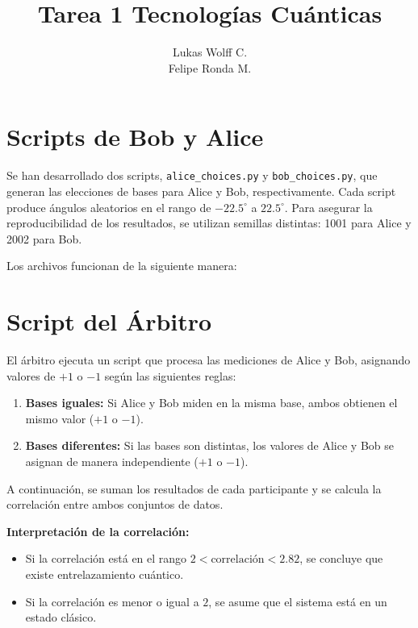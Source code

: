 \documentclass[11pt]{article}
\title{Tarea 1 Tecnologías Cuánticas}
\author{Lukas Wolff C.\\
        Felipe Ronda M.}
\date{}
\begin{document}
\maketitle

\section{Scripts de Bob y Alice}

Se han desarrollado dos scripts, \texttt{alice\_choices.py} y \texttt{bob\_choices.py}, que generan las elecciones de bases para Alice y Bob, respectivamente. Cada script produce ángulos aleatorios en el rango de $-22.5^\circ$ a $22.5^\circ$. Para asegurar la reproducibilidad de los resultados, se utilizan semillas distintas: 1001 para Alice y 2002 para Bob.

Los archivos funcionan de la siguiente manera:

\section{Script del Árbitro}

El árbitro ejecuta un script que procesa las mediciones de Alice y Bob, asignando valores de $+1$ o $-1$ según las siguientes reglas:

\begin{enumerate}
    \item \textbf{Bases iguales:} Si Alice y Bob miden en la misma base, ambos obtienen el mismo valor ($+1$ o $-1$).
    \item \textbf{Bases diferentes:} Si las bases son distintas, los valores de Alice y Bob se asignan de manera independiente ($+1$ o $-1$).
\end{enumerate}

A continuación, se suman los resultados de cada participante y se calcula la correlación entre ambos conjuntos de datos.

\textbf{Interpretación de la correlación:}
\begin{itemize}
    \item Si la correlación está en el rango $2 < \text{correlación} < 2.82$, se concluye que existe entrelazamiento cuántico.
    \item Si la correlación es menor o igual a $2$, se asume que el sistema está en un estado clásico.
\end{itemize}
\end{document}
